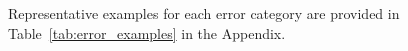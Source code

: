 Representative examples for each error category are provided in Table~\ref{tab:error_examples} in the Appendix.